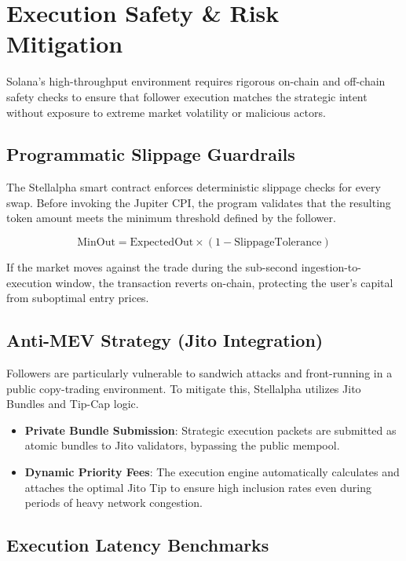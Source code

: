 \section{Execution Safety \& Risk Mitigation}

Solana's high-throughput environment requires rigorous on-chain and off-chain safety checks to ensure that follower execution matches the strategic intent without exposure to extreme market volatility or malicious actors.

\subsection{Programmatic Slippage Guardrails}

The Stellalpha smart contract enforces deterministic slippage checks for every swap. Before invoking the Jupiter CPI, the program validates that the resulting token amount meets the minimum threshold defined by the follower.

\[
\text{MinOut} = \text{ExpectedOut} \times (1 - \text{SlippageTolerance})
\]

If the market moves against the trade during the sub-second ingestion-to-execution window, the transaction reverts on-chain, protecting the user's capital from suboptimal entry prices.

\subsection{Anti-MEV Strategy (Jito Integration)}

Followers are particularly vulnerable to sandwich attacks and front-running in a public copy-trading environment. To mitigate this, Stellalpha utilizes Jito Bundles and Tip-Cap logic.

\begin{itemize}
  \item \textbf{Private Bundle Submission}: Strategic execution packets are submitted as atomic bundles to Jito validators, bypassing the public mempool.
  \item \textbf{Dynamic Priority Fees}: The execution engine automatically calculates and attaches the optimal Jito Tip to ensure high inclusion rates even during periods of heavy network congestion.
\end{itemize}

\subsection{Execution Latency Benchmarks}

